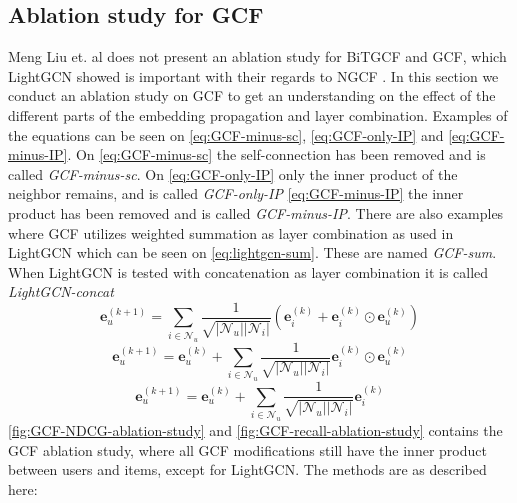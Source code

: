 \subsection{Ablation study for GCF}
Meng Liu et. al does not present an ablation study for BiTGCF and GCF, which LightGCN showed is important with their regards to NGCF \cite{lightgcn,BiTGCF}.
In this section we conduct an ablation study on GCF to get an understanding on the effect of the different parts of the embedding propagation and layer combination.
Examples of the equations can be seen on \autoref{eq:GCF-minus-sc}, \autoref{eq:GCF-only-IP} and \autoref{eq:GCF-minus-IP}.
On \autoref{eq:GCF-minus-sc} the self-connection has been removed and is called \textit{GCF-minus-sc}.
On \autoref{eq:GCF-only-IP} only the inner product of the neighbor remains, and is called \textit{GCF-only-IP}
\autoref{eq:GCF-minus-IP} the inner product has been removed and is called \textit{GCF-minus-IP}.
There are also examples where GCF utilizes weighted summation as layer combination as used in LightGCN which can be seen on \autoref{eq:lightgcn-sum}.
These are named \textit{GCF-sum}.
When LightGCN is tested with concatenation as layer combination it is called \textit{LightGCN-concat}
\begin{equation}
    \mathbf{e}_{u}^{(k+1)} = \sum^{}_{i \in \mathcal{N}_u}  \frac{1}{\sqrt{|\mathcal{N}_u||\mathcal{N}_i|}}\left( \mathbf{e}_i^{(k)} + \mathbf{e}_i^{(k)} \odot \mathbf{e}_u^{(k)} \right)
    \label{eq:GCF-minus-sc}
\end{equation}
\begin{equation}
    \mathbf{e}_{u}^{(k+1)} = \mathbf{e}_{u}^{(k)} + \sum^{}_{i \in \mathcal{N}_u}  \frac{1}{\sqrt{|\mathcal{N}_u||\mathcal{N}_i|}} \mathbf{e}_i^{(k)} \odot \mathbf{e}_u^{(k)}
    \label{eq:GCF-only-IP}
\end{equation}
\begin{equation}
    \mathbf{e}_{u}^{(k+1)} = \mathbf{e}_{u}^{(k)} + \sum^{}_{i \in \mathcal{N}_u}  \frac{1}{\sqrt{|\mathcal{N}_u||\mathcal{N}_i|}} \mathbf{e}_i^{(k)}
    \label{eq:GCF-minus-IP}
\end{equation}
\autoref{fig:GCF-NDCG-ablation-study} and \autoref{fig:GCF-recall-ablation-study} contains the GCF ablation study, where all GCF modifications still have the inner product between users and items, except for LightGCN.
The methods are as described here:\\
